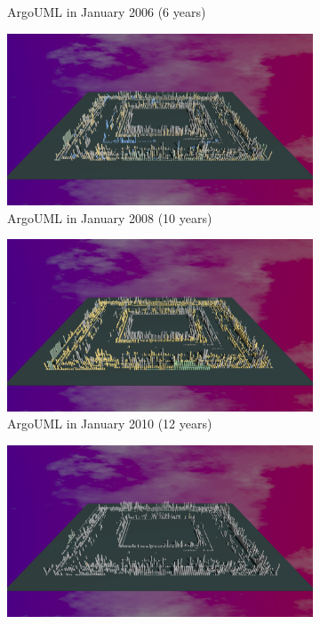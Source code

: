 \begin{figure}[ht]
\begin{subfigure}{0.48\textwidth}
        \caption{ArgoUML in January 2006 (6 years)} 
        \label{fig:ArgoUML_V3_S3}
    \end{subfigure}\hspace*{\fill}
    \begin{subfigure}{0.48\textwidth}
        \includegraphics[width=\linewidth]{ArgoUML/Animation010.png}
        \caption{ArgoUML in January 2008 (10 years)} 
        \label{fig:ArgoUML_V3_S4}
    \end{subfigure}
    \medskip
    \begin{subfigure}{0.48\textwidth}
        \includegraphics[width=\linewidth]{ArgoUML/Animation012.png}
        \caption{ArgoUML in January 2010 (12 years)} 
        \label{fig:ArgoUML_V3_S5}
    \end{subfigure}\hspace*{\fill}
    \begin{subfigure}{0.48\textwidth}
        \includegraphics[width=\linewidth]{ArgoUML/Animation022.png}

\end{subfigure}
\end{figure}

